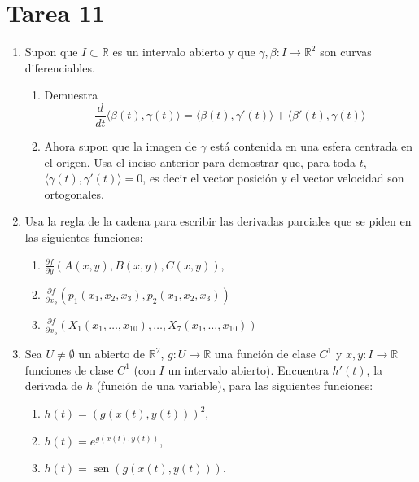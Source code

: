 \documentclass{article}
\theoremstyle{definition}
\newcommand{\sen}{\operatorname{sen}}
\begin{document}
\section*{Tarea 11 }


\begin{enumerate}


  \item Supon que $I\subset \mathbb{R}$ es un intervalo abierto
    y que $\gamma,\beta :I\to \mathbb{R}^2$  son curvas diferenciables.
    \begin{enumerate}
      \item Demuestra
        $$
        \frac{d}{dt} \langle \beta(t), \gamma(t) \rangle
        =\langle \beta(t), \gamma'(t) \rangle
        + \langle \beta'(t) , \gamma(t) \rangle
        $$
      \item Ahora supon que la imagen de $\gamma$ est\'a contenida
        en una esfera centrada en el origen. Usa el inciso anterior
        para demostrar que, para toda $t$,
        $\langle \gamma(t), \gamma'(t)\rangle=0$, es decir
        el vector posici\'on y el vector velocidad son ortogonales.

      \end{enumerate}
      
  \item Usa la regla de la cadena para escribir las derivadas 
    parciales que se piden en las siguientes funciones:

    \begin{enumerate}
    \item $\frac{\partial f}{\partial y}(A(x,y),B(x,y),C(x,y))$,
    \item $\frac{\partial f}{\partial x_2}(p_1(x_1,x_2,x_3),p_2(x_1,x_2,x_3))$
    \item $\frac{\partial f}{\partial x_5}
      (X_1(x_1, \dots, x_{10}), \dots, X_{7}(x_1,\dots, x_{10}))$
    \end{enumerate}

\item Sea $U\ne \emptyset$ un abierto de
  $\mathbb{R}^2$, $g:U\to \mathbb{R}$ una funci\'on de clase $C^1$
  y $x,y:I\to \mathbb{R}$ funciones  de clase $C^1$
  (con $I$ un intervalo abierto).
  Encuentra $h'(t)$, la derivada de
  $h$ (funci\'on de una variable), para las siguientes funciones:
  \begin{enumerate}
  \item $h(t)=(g(x(t), y(t)))^2$,
  \item $h(t)=e^{g(x(t),y(t))}$,
  \item $h(t)=\sen(g(x(t),y(t)))$.
  \end{enumerate}



\end{enumerate}
\end{document}
